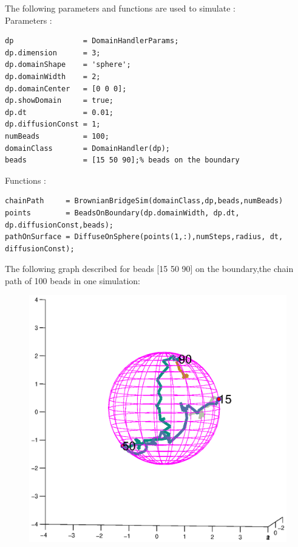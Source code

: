 \documentclass{article}
\begin{document}
The following parameters and functions are used to simulate :\\

Parameters :
\begin{lstlisting}
dp                = DomainHandlerParams;
dp.dimension      = 3;
dp.domainShape    = 'sphere';
dp.domainWidth    = 2;
dp.domainCenter   = [0 0 0];
dp.showDomain     = true;
dp.dt             = 0.01;
dp.diffusionConst = 1;
numBeads          = 100;
domainClass       = DomainHandler(dp);
beads             = [15 50 90];% beads on the boundary
\end{lstlisting}

Functions :
\begin{lstlisting}
chainPath     = BrownianBridgeSim(domainClass,dp,beads,numBeads)
points        = BeadsOnBoundary(dp.domainWidth, dp.dt, dp.diffusionConst,beads);
pathOnSurface = DiffuseOnSphere(points(1,:),numSteps,radius, dt, diffusionConst);
\end{lstlisting}

The following graph described for beads [15 50 90] on the boundary,the chain path of 100 beads in one simulation:\\
\begin{figure}[H]
\centering
\includegraphics[width=7.2in]{bOnB.eps}	
\end{figure}
\end{document}
